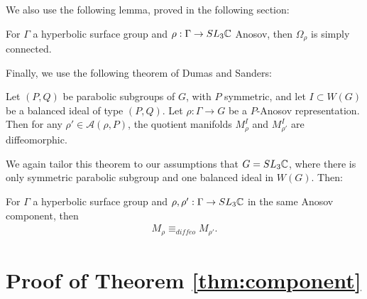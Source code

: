 We also use the following lemma, proved in the following section:
\begin{lemma}\label{lem:pi1-dod}
    For $\Gamma$ a hyperbolic surface group and $\rho:\Gamma \rightarrow SL_3\mathbb{C}$ Anosov,
    then $\Omega_\rho$ is simply connected.
\end{lemma}

Finally, we use the following theorem of Dumas and Sanders:
\begin{theorem}\label{thm:ds-diffeo}
    Let $(P,Q)$ be parabolic subgroups of $G$, with $P$ symmetric, 
    and let $I \subset W(G)$ be a balanced ideal of type $(P,Q)$.
    Let $\rho:\Gamma \rightarrow G$ be a $P$-Anosov representation. 
    Then for any $\rho' \in \mathcal{A}(\rho,P)$, 
    the quotient manifolds $M^I_\rho$ and $M^I_{\rho'}$ are diffeomorphic. 
\end{theorem}

We again tailor this theorem to our assumptions that $G = SL_3\mathbb{C}$,
where there is only symmetric parabolic subgroup and one balanced ideal in $W(G)$.
Then:
\begin{remark}
    For $\Gamma$ a hyperbolic surface group 
    and $\rho,\rho':\Gamma \rightarrow SL_3\mathbb{C}$ in the same Anosov component,
    then 
    \begin{align}
        M_\rho \equiv_{diffeo} M_{\rho'}.
    \end{align}
\end{remark}

\section{Proof of Theorem \ref{thm:component}}


